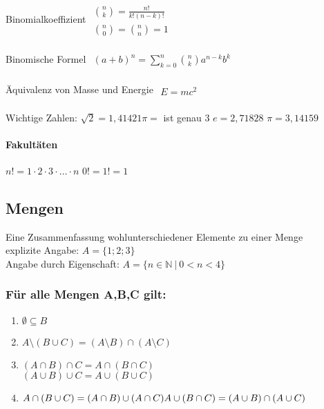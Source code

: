 \documentclass[6pt,a4paper]{scrartcl}
\begin{document}
\begin{multicols*}{4}
Binomialkoeffizient \qquad \qquad \qquad
\begin{math}\begin{array}{l}
	\binom{n}{k} = \frac{n!}{k!(n-k)!}  \\
	\binom{n}{0} = \binom{n}{n} = 1
\end{array}\end{math}\\ 
\\                   
Binomische Formel \qquad \qquad \qquad 
\begin{math}\begin{array}{l}
	(a+b)^n = \sum\limits_{k = 0}^{n} \binom{n}{k} a^{n-k} b^{k}
\end{array}\end{math}   \\ 
\\
Äquivalenz von Masse und Energie
\begin{math}\begin{array}{l}
	E = mc^2 
\end{array}\end{math}\\ 
\\ 
Wichtige Zahlen: $\sqrt{2} = 1,41421$\quad $\pi=$ ist genau 3 \quad $e = 2,71828$ \quad $\pi =  3,14159$

\paragraph{Fakultäten} %
\label{par:fakultaeten}
$n! = 1 \cdot 2 \cdot 3 \cdot \ldots \cdot n$ \qquad  $0! = 1! = 1$ 



\subsection{Mengen}

Eine Zusammenfassung wohlunterschiedener Elemente zu einer Menge\\
explizite Angabe: $A=\{1;2;3\}$\\
Angabe durch Eigenschaft: $A=\{n\in\mathbb N\ \vert\ 0<n<4\}$\\
\subsubsection{Für alle Mengen A,B,C gilt:}
\begin{enumerate}\itemsep-1pt
\item $\emptyset \subseteq B $
\item $A \setminus (B \cup C) = (A \setminus B) \cap (A \setminus C)$
\item $(A \cap B) \cap C = A \cap (B \cap C)$\\
	$(A \cup B) \cup C = A \cup (B \cup C)$
\item $A \cap (B \cup C) = (A \cap B) \cup (A \cap C) \\
	A \cup (B \cap C) = (A \cup B) \cap (A \cup C)$
\end{enumerate}



\end{multicols*}
\end{document}
